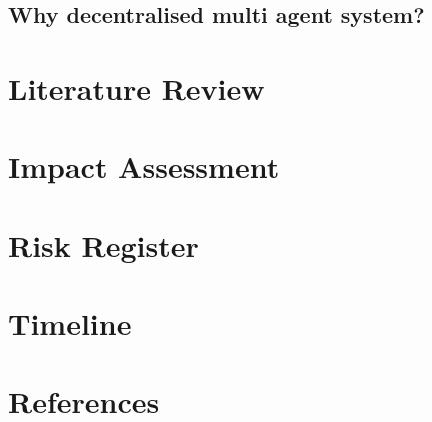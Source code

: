 \documentclass[12pt, oneside]{article}
\begin{document}
\subsection{Why decentralised multi agent system?}


\section{Literature Review}
\section{Impact Assessment}
\section{Risk Register}
\section{Timeline}


\section{References}




\end{document}
